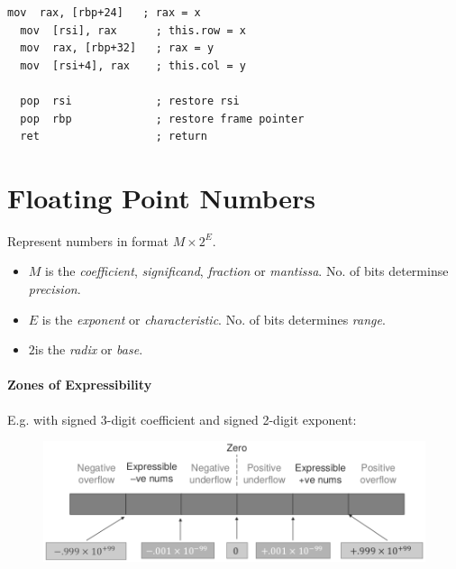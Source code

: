 \documentclass[twocolumn,english]{article}
\begin{document}
\begin{table}[H]
\begin{minipage}[t]{0.3\textwidth}
\begin{centering}
\begin{lstlisting}[basicstyle={\scriptsize\ttfamily},breaklines=true,keywords={loop, exit, when, end}]
  mov  rax, [rbp+24]   ; rax = x
  mov  [rsi], rax      ; this.row = x
  mov  rax, [rbp+32]   ; rax = y
  mov  [rsi+4], rax    ; this.col = y

  pop  rsi             ; restore rsi
  pop  rbp             ; restore frame pointer
  ret                  ; return
\end{lstlisting}

\par\end{centering}

\noindent \centering{}\end{minipage}
\end{table}



\section{Floating Point Numbers}

Represent numbers in format $M\times2^{E}$.
\begin{itemize}
\item $M$ is the \emph{coefficient}, \emph{significand}, \emph{fraction}
or \emph{mantissa}. No. of bits determinse \emph{precision}.
\item $E$ is the \emph{exponent} or \emph{characteristic}. No. of bits
determines \emph{range}.
\item $2$is the \emph{radix} or \emph{base}.
\end{itemize}

\paragraph{Zones of Expressibility}

E.g. with signed 3-digit coefficient and signed 2-digit exponent:

\begin{figure}[H]
\noindent \centering{}\includegraphics[scale=0.3]{img/floatrange}
\end{figure}
\end{document}
